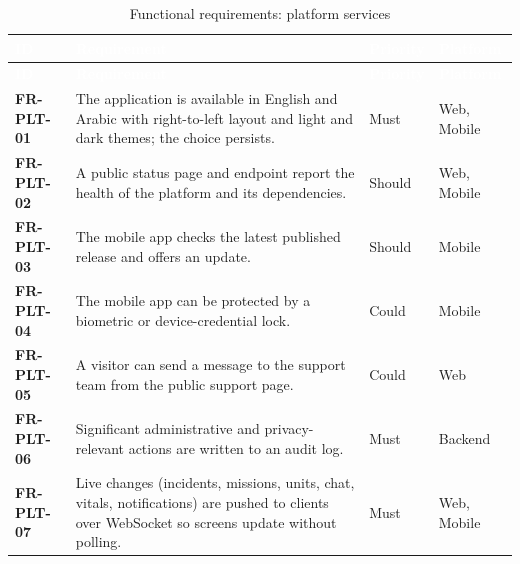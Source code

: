 {\tabfont\rowband
\begin{longtable}{@{}>{\raggedright\arraybackslash}p{}>{\raggedright\arraybackslash}p{}>{\raggedright\arraybackslash}p{}>{\raggedright\arraybackslash}p{}@{}}
\caption{Functional requirements: platform services}\label{tab:fr-plt}\\
\rowcolor{najdanavy}\textcolor{white}{\sffamily\bfseries\small ID} & \textcolor{white}{\sffamily\bfseries\small Requirement} & \textcolor{white}{\sffamily\bfseries\small Priority} & \textcolor{white}{\sffamily\bfseries\small Platform}\\
\endfirsthead
\rowcolor{najdanavy}\textcolor{white}{\sffamily\bfseries\small ID} & \textcolor{white}{\sffamily\bfseries\small Requirement} & \textcolor{white}{\sffamily\bfseries\small Priority} & \textcolor{white}{\sffamily\bfseries\small Platform}\\
\endhead
\bottomrule\endlastfoot
\textbf{FR-PLT-01} & The application is available in English and Arabic with right-to-left layout and light and dark themes; the choice persists. & Must & Web, Mobile\\
\textbf{FR-PLT-02} & A public status page and endpoint report the health of the platform and its dependencies. & Should & Web, Mobile\\
\textbf{FR-PLT-03} & The mobile app checks the latest published release and offers an update. & Should & Mobile\\
\textbf{FR-PLT-04} & The mobile app can be protected by a biometric or device-credential lock. & Could & Mobile\\
\textbf{FR-PLT-05} & A visitor can send a message to the support team from the public support page. & Could & Web\\
\textbf{FR-PLT-06} & Significant administrative and privacy-relevant actions are written to an audit log. & Must & Backend\\
\textbf{FR-PLT-07} & Live changes (incidents, missions, units, chat, vitals, notifications) are pushed to clients over WebSocket so screens update without polling. & Must & Web, Mobile\\
\end{longtable}}
